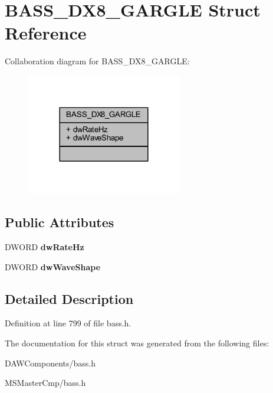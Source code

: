 \hypertarget{struct_b_a_s_s___d_x8___g_a_r_g_l_e}{\section{B\-A\-S\-S\-\_\-\-D\-X8\-\_\-\-G\-A\-R\-G\-L\-E Struct Reference}
\label{struct_b_a_s_s___d_x8___g_a_r_g_l_e}
}


Collaboration diagram for B\-A\-S\-S\-\_\-\-D\-X8\-\_\-\-G\-A\-R\-G\-L\-E\-:\nopagebreak
\begin{figure}[H]
\begin{center}
\leavevmode
\includegraphics[width=192pt]{struct_b_a_s_s___d_x8___g_a_r_g_l_e__coll__graph}
\end{center}
\end{figure}
\subsection*{Public Attributes}
\begin{DoxyCompactItemize}
\item 
\hypertarget{struct_b_a_s_s___d_x8___g_a_r_g_l_e_a0338a456e4a61784c095203642b3e801_a0338a456e4a61784c095203642b3e801}{D\-W\-O\-R\-D {\bfseries dw\-Rate\-Hz}}\label{struct_b_a_s_s___d_x8___g_a_r_g_l_e_a0338a456e4a61784c095203642b3e801_a0338a456e4a61784c095203642b3e801}

\item 
\hypertarget{struct_b_a_s_s___d_x8___g_a_r_g_l_e_aca685edf6d4938d62830ce4a834f0e28_aca685edf6d4938d62830ce4a834f0e28}{D\-W\-O\-R\-D {\bfseries dw\-Wave\-Shape}}\label{struct_b_a_s_s___d_x8___g_a_r_g_l_e_aca685edf6d4938d62830ce4a834f0e28_aca685edf6d4938d62830ce4a834f0e28}

\end{DoxyCompactItemize}


\subsection{Detailed Description}


Definition at line 799 of file bass.\-h.



The documentation for this struct was generated from the following files\-:\begin{DoxyCompactItemize}
\item 
D\-A\-W\-Components/bass.\-h\item 
M\-S\-Master\-Cmp/bass.\-h\end{DoxyCompactItemize}
